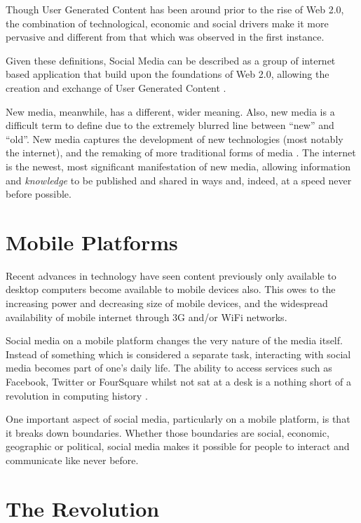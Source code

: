 \documentclass[a4paper,11pt]{article}
\begin{document}
    Though User Generated Content has been around prior to the rise of Web 2.0,
    the combination of technological, economic and social drivers make it more
    pervasive and different from that which was observed in the first instance.

    Given these definitions, Social Media can be described as a group of
    internet based application that build upon the foundations of Web 2.0,
    allowing the creation and exchange of User Generated Content
    \cite{kaplan2010}.

    New media, meanwhile, has a different, wider meaning. Also, new media is
    a difficult term to define due to the extremely blurred line between
    ``new'' and ``old''. New media captures the development of new technologies
    (most notably the internet), and the remaking of more traditional forms of
    media \cite{flew2008}. The internet is the newest, most significant
    manifestation of new media, allowing information and \emph{knowledge} to be
    published and shared in ways and, indeed, at a speed never before
    possible.

    \section{Mobile Platforms}

    Recent advances in technology have seen content previously only available
    to desktop computers become available to mobile devices also. This owes to
    the increasing power and decreasing size of mobile devices, and the
    widespread availability of mobile internet through 3G and/or WiFi networks.

    Social media on a mobile platform changes the very nature of the media
    itself. Instead of something which is considered a separate task,
    interacting with social media becomes part of one's daily life. The ability
    to access services such as Facebook, Twitter or FourSquare whilst not sat
    at a desk is a nothing short of a revolution in computing history
    \cite{smith2009}.

    One important aspect of social media, particularly on a mobile platform, is
    that it breaks down boundaries. Whether those boundaries are social,
    economic, geographic or political, social media makes it possible for
    people to interact and communicate like never before.

    \section{The Revolution}
\end{document}
